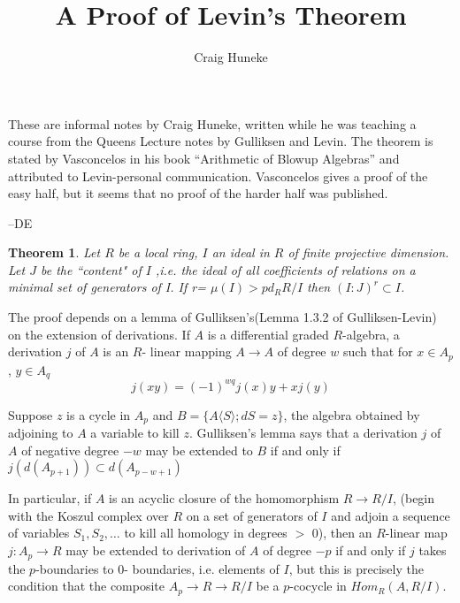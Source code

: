 \documentclass[11pt, oneside]{article}   	%
\title{A Proof of Levin's Theorem}
\author{Craig Huneke}
\newtheorem{Theorem}{Theorem}
\begin{document}
\maketitle

These are informal notes by Craig Huneke, written while he was teaching a course from
the Queens Lecture notes by Gulliksen and Levin. The theorem is stated by
Vasconcelos in his book ``Arithmetic of Blowup Algebras'' and attributed to 
Levin-personal communication. Vasconcelos gives a proof of the easy half,
but it seems that no proof of the harder half was published.

	--DE

\begin{Theorem}
 Let $R$ be a local ring, $I$ an ideal in $R$ of finite projective
dimension. Let
$J$ be the ``content" of $I$ ,i.e. the ideal of all coefficients of relations
on a minimal set of generators of I. If r= $\mu(I) > pd_RR/I $ then
$(I:J)^r \subset I$.
\end{Theorem}

The proof depends on a lemma of Gulliksen's(Lemma 1.3.2 of Gulliksen-Levin)
on the extension of derivations.
If $A$ is a differential graded $R$-algebra,  a derivation $j$ of $A$ is an $R$-
linear mapping  $A \to A$ of degree $w$ such that for $x \in A_p$ , $y \in
A_q$
$$ j(xy)=(-1)^{wq}j(x)y + xj(y) $$

    Suppose $z$ is a cycle in $A_p$ and $B = \{ A\langle S \rangle ; dS =
z\}$, the algebra obtained by adjoining to $A$ a variable to kill $z$.
Gulliksen's lemma says that a derivation $j$ of $A$ of negative degree $-w$ may
be
extended   to $B$ if
and only if $j(d(A_{p+1})) \subset d(A_{p-w+1}) $

  In particular, if $A$ is an acyclic closure of the homomorphism $R \to R/I$,
(begin with the Koszul complex over $R$ on a set of generators of $I$ and
adjoin a sequence of variables $S_1,S_2,\ldots $ to kill all homology in
degrees $>$ 0), then an $R$-linear map $j:A_p \to R$ may be extended to derivation
of $A$ of degree $-p$ if and only if $j$ takes the $p$-boundaries to 0-
boundaries, i.e. elements of $I$, but this is precisely the condition that the
composite $A_p \to R \to R/I $ be a $p$-cocycle in $Hom_R(A,R/I)$. 
\end{document}
